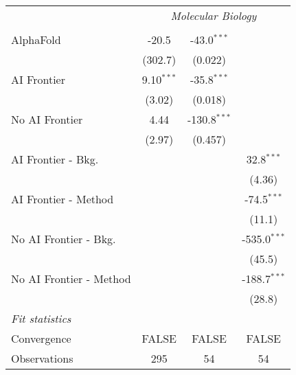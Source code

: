 \begin{tabular}{lccc}
 & \multicolumn{3}{c}{\textit{Molecular Biology}} \\ \\
   AlphaFold               & -20.5        & -43.0$^{***}$  &   \\   
                           & (302.7)      & (0.022)        &   \\   
   AI Frontier             & 9.10$^{***}$ & -35.8$^{***}$  &   \\   
                           & (3.02)       & (0.018)        &   \\   
   No AI Frontier          & 4.44         & -130.8$^{***}$ &   \\   
                           & (2.97)       & (0.457)        &   \\   
   AI Frontier - Bkg.      &              &                & 32.8$^{***}$\\   
                           &              &                & (4.36)\\   
   AI Frontier - Method    &              &                & -74.5$^{***}$\\   
                           &              &                & (11.1)\\   
   No AI Frontier - Bkg.   &              &                & -535.0$^{***}$\\   
                           &              &                & (45.5)\\   
   No AI Frontier - Method &              &                & -188.7$^{***}$\\   
                           &              &                & (28.8)\\   
   \midrule
   \emph{Fit statistics}\\
   Convergence             &FALSE         & FALSE          & FALSE\\  
   Observations            & 295          & 54             & 54\\  
   

\end{tabular}
